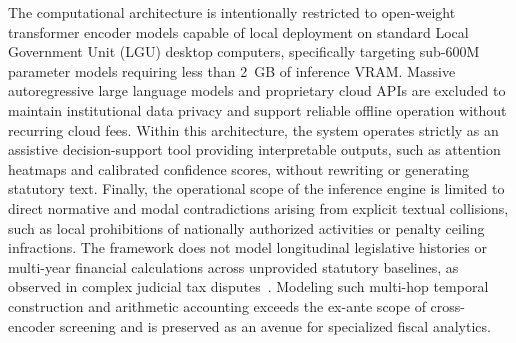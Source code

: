 The computational architecture is intentionally restricted to open-weight transformer encoder models capable of local deployment on standard Local Government Unit (LGU) desktop computers, specifically targeting sub-600M parameter models requiring less than 2~GB of inference VRAM. Massive autoregressive large language models and proprietary cloud APIs are excluded to maintain institutional data privacy and support reliable offline operation without recurring cloud fees. Within this architecture, the system operates strictly as an assistive decision-support tool providing interpretable outputs, such as attention heatmaps and calibrated confidence scores, without rewriting or generating statutory text. Finally, the operational scope of the inference engine is limited to direct normative and modal contradictions arising from explicit textual collisions, such as local prohibitions of nationally authorized activities or penalty ceiling infractions. The framework does not model longitudinal legislative histories or multi-year financial calculations across unprovided statutory baselines, as observed in complex judicial tax disputes~\cite{scp2017mindanaoshopping}. Modeling such multi-hop temporal construction and arithmetic accounting exceeds the ex-ante scope of cross-encoder screening and is preserved as an avenue for specialized fiscal analytics.


